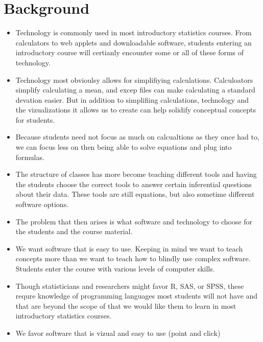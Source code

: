 \documentclass[11pt]{article}
\begin{document}
\section{Background}
\begin{itemize}
\item Technology is commonly used in most introductory statistics courses. From calculators to web applets and downloadable software, students entering an introductory course will certianly encounter some or all of these forms of technology.  
\item Technology most obvioulsy allows for simplifiying calculations. Calculoators simplify calculating a mean, and excep files can make calculating a standard devation easier. But in addition to simplifiing calculations, technology and the vizualizations it allows us to create can help solidify conceptual concepts for students.
\item Because students need not focus as much on calcualtions as they once had to, we can focus less on then being able to solve equations and plug into formulas.
\item The structure of classes has more become teaching different tools and having the students choose the correct tools to answer certain inferential questions about their data. These tools are still equations, but also sometime different software options.
\item The problem that then arises is what software and technology to choose for the students and the course material. 
\item We want software that is easy to use. Keeping in mind we want to teach concepts more than we want to teach how to blindly use complex software. Students enter the course with various levels of computer skills. 
\item Though statisticians and researchers might favor R, SAS, or SPSS, these requre knowledge of programming languages most students will not have and that are beyond the scope of that we would like them to learn in most introductory statistics courses. 
\item We favor software that is vizual and easy to use (point and click)
\end{itemize}
\end{document}
